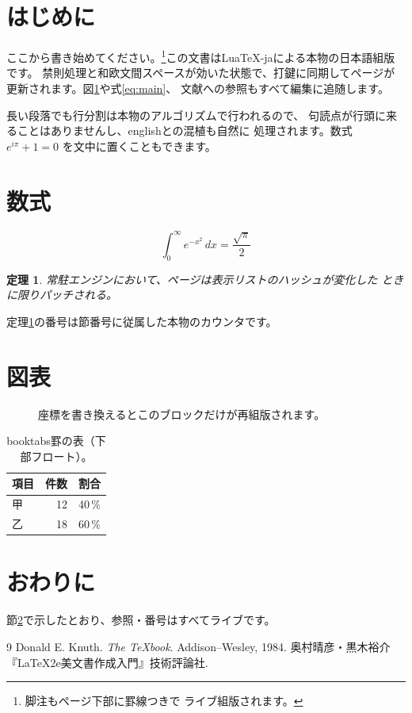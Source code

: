 \documentclass{jlreq}
\newtheorem{theorem}{定理}[section]
\begin{document}
\tableofcontents

\section{はじめに}
\label{sec:intro}

ここから書き始めてください。\footnote{脚注もページ下部に罫線つきで
ライブ組版されます。}この文書はLuaTeX-jaによる本物の日本語組版です。
禁則処理と和欧文間スペースが効いた状態で、打鍵に同期してページが
更新されます。図\ref{fig:example}や式\eqref{eq:main}、
文献\cite{knuth84}への参照もすべて編集に追随します。

長い段落でも行分割は本物のアルゴリズムで行われるので、
句読点が行頭に来ることはありませんし、englishとの混植も自然に
処理されます。数式 $e^{i\pi}+1=0$ を文中に置くこともできます。

\section{数式}
\label{sec:math}

\begin{equation}
  \label{eq:main}
  \int_0^\infty e^{-x^2}\,dx = \frac{\sqrt{\pi}}{2}
\end{equation}

\begin{theorem}
  \label{thm:main}
  常駐エンジンにおいて、ページは表示リストのハッシュが変化した
  ときに限りパッチされる。
\end{theorem}

定理\ref{thm:main}の番号は節番号に従属した本物のカウンタです。

\section{図表}
\label{sec:figs}

\begin{figure}[t]
\centering
{}
\caption{座標を書き換えるとこのブロックだけが再組版されます。}
\label{fig:example}
\end{figure}

\begin{table}[b]
\centering
\begin{tabular}{lrr}
\toprule
項目 & 件数 & 割合 \\
\midrule
甲 & 12 & 40\,\% \\
乙 & 18 & 60\,\% \\
\bottomrule
\end{tabular}
\caption{booktabs罫の表（下部フロート）。}
\label{tab:example}
\end{table}

\section{おわりに}

節\ref{sec:math}で示したとおり、参照・番号はすべてライブです。

\begin{thebibliography}{9}
 Donald E. Knuth. \emph{The \TeX book}.
Addison--Wesley, 1984.
 奥村晴彦・黒木裕介『LaTeX2e美文書作成入門』技術評論社.
\end{thebibliography}
\end{document}
